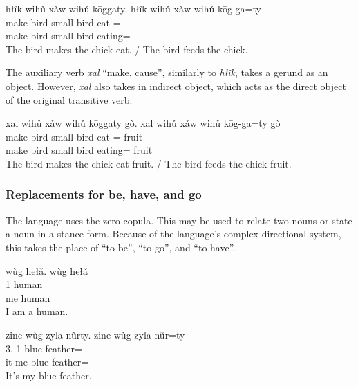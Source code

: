 \documentclass[12pt]{article}
\begin{document}
    \begin{exe}
        \ex
        \glt
        hłîk wihǔ xǎw wihǔ kōggaty.
        \glll
        hłîk wihǔ xǎw wihǔ kōg-ga=ty \\
        make bird small bird eat-\Ger{}=\Poss{} \\
        make bird small bird eating=\Poss{} \\
        \glt
        The bird makes the chick eat.
        /
        The bird feeds the chick.
    \end{exe}

    The auxiliary verb \textit{xal} ``make, cause'',
    similarly to \textit{hłĩk},
    takes a gerund as an object.
    However, \textit{xal} also takes in indirect object,
    which acts as the direct object of the original transitive verb.

    \begin{exe}
        \ex
        \glt
        xal wihǔ xǎw wihǔ kōggaty gò.
        \glll
        xal wihǔ xǎw wihǔ kōg-ga=ty gò \\
        make bird small bird eat-\Ger{}=\Poss{} fruit \\
        make bird small bird eating=\Poss{} fruit \\
        \glt
        The bird makes the chick eat fruit.
        /
        The bird feeds the chick fruit.
    \end{exe}

    \subsubsection*{Replacements for be, have, and go}

    The language uses the zero copula.
    This may be used to relate two nouns
    or state a noun in a stance form.
    Because of the language's complex directional system,
    this takes the place of ``to be'', ``to go'', and ``to have''.

    \begin{exe}
        \ex
        \glt
        wùg hełǎ.
        \glll
        wùg hełǎ \\
        1\Sg{} human \\
        me human \\
        \glt
        I am a human.
    \end{exe}

    \begin{exe}
        \ex
        \glt
        zine wùg zyla nũrty.
        \glll
        zine wùg zyla nũr=ty \\
        3\Sg{}.\Inanim{} 1\Sg{} blue feather=\Poss{} \\
        it me blue feather=\Poss{} \\
        \glt
        It's my blue feather.
    \end{exe}
\end{document}
